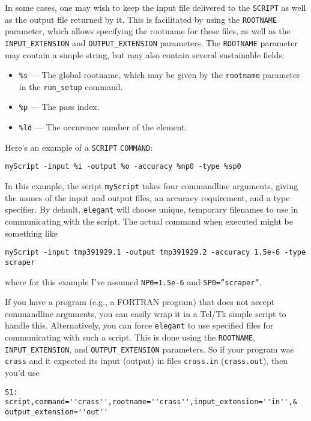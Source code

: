 In some cases, one may wish to keep the input file delivered to the \verb|SCRIPT| as
well as the output file returned by it. This is facilitated by using the \verb|ROOTNAME| 
parameter, which allows specifying the rootname for these files, as well as the
\verb|INPUT_EXTENSION| and \verb|OUTPUT_EXTENSION| parameters.
The \verb|ROOTNAME| parameter may contain a simple string, but may also contain several
sustainable fields:
\begin{itemize}
\item \verb|%s| --- The global rootname, which may be given by the \verb|rootname| parameter
  in the \verb|run_setup| command.
\item \verb|%p| --- The pass index.
\item \verb|%ld| --- The occurence number of the element.
\end{itemize}

Here's an example of a {\tt SCRIPT} {\tt COMMAND}:
\begin{flushleft}
\begin{verbatim}
myScript -input %i -output %o -accuracy %np0 -type %sp0
\end{verbatim}
\end{flushleft}
In this example, the script {\tt myScript} takes four commandline arguments, giving
the names of the input and output files, an accuracy requirement, and a type specifier.
By default, {\tt elegant} will choose unique, temporary filenames to use in communicating
with the script.  The actual command when executed might be something like
\begin{flushleft}
\begin{verbatim}
myScript -input tmp391929.1 -output tmp391929.2 -accuracy 1.5e-6 -type scraper
\end{verbatim}
\end{flushleft}
where for this example I've assumed {\tt NP0=1.5e-6} and {\tt SP0=''scraper''}.

If you have a program (e.g., a FORTRAN program) that does not accept
commandline arguments, you can easily wrap it in a Tcl/Tk simple script to
handle this.  Alternatively, you can force {\tt elegant} to use specified 
files for communicating with such a script.  This is done using the {\tt ROOTNAME},
{\tt INPUT\_EXTENSION}, and {\tt OUTPUT\_EXTENSION} parameters.
So if your program was {\tt crass} and it expected its input (output) in files
{\tt crass.in} ({\tt crass.out}), then you'd use
\begin{flushleft}
\begin{verbatim}
S1: script,command=''crass'',rootname=''crass'',input_extension=''in'',&
output_extension=''out''
\end{verbatim}
\end{flushleft}

